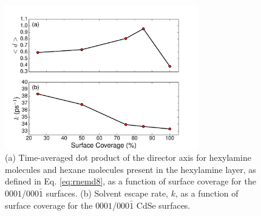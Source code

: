 \begin{figure}
\begin{center}
\includegraphics[width=0.75\textwidth]{./Chapter4/rnemd7.pdf}
\caption[Alignment and time-averaged residence time of solvent molecules in a passivating ligand layer on a CdSe surface.]{(a) Time-averaged dot product of the director axis for hexylamine molecules and hexane molecules present in the hexylamine layer, as defined in Eq. \ref{eq:rnemd8}, as a function of surface coverage for the $0001$/$000\bar{1}$ surfaces. (b) Solvent escape rate, $k$, as a function of surface coverage for the $0001$/$000\bar{1}$ CdSe surfaces.}
\label{f:rnemd7}
\end{center}
\end{figure}

